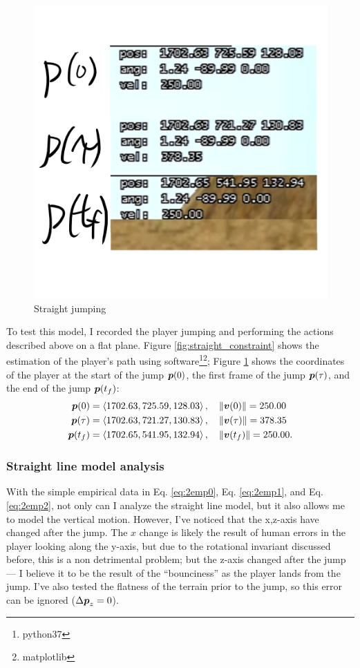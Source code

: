 \begin{figure}[H]
\begin{minipage}{.5\textwidth}
        \includegraphics[width=0.9\linewidth]{assets/2straightjumping.png}
        \caption{Straight jumping}
        \label{fig:2straightjumping}
    \end{minipage}
\end{figure}

To test this model, I recorded the player jumping and performing the actions described above on a flat plane. Figure \ref{fig:straight_constraint} shows the estimation of the player's path using software\footnote{python37}\footnote{matplotlib}; Figure \ref{fig:2straightjumping} shows the coordinates of the player at the start of the jump $\boldsymbol{p}(0)$, the first frame of the jump $\boldsymbol{p}(\tau)$, and the end of the jump $\boldsymbol{p}(t_f)$:
\begin{align}
 \boldsymbol{p}(0) &= \left\langle 1702.63, 725.59, 128.03 \right\rangle, \quad \|\boldsymbol{v}(0)\| = 250.00 \label{eq:2emp0}\\
 \boldsymbol{p}(\tau) &= \left\langle 1702.63, 721.27, 130.83 \right\rangle, \quad \|\boldsymbol{v}(\tau)\| = 378.35 \label{eq:2emp1}\\
 \boldsymbol{p}(t_f) &= \left\langle 1702.65,541.95, 132.94 \right\rangle, \quad \|\boldsymbol{v}(t_f)\| = 250.00 \label{eq:2emp2}.
\end{align}

\subsubsection{Straight line model analysis}
With the simple empirical data in Eq. \ref{eq:2emp0}, Eq. \ref{eq:2emp1}, and Eq. \ref{eq:2emp2}, not only can I analyze the straight line model, but it also allows me to model the vertical motion. However, I've noticed that the x,z-axis have changed after the jump. The $x$ change is likely the result of human errors in the player looking along the y-axis, but due to the rotational invariant discussed before, this is a non detrimental problem; but the z-axis changed after the jump --- I believe it to be the result of the ``bounciness'' as the player lands from the jump. I've also tested the flatness of the terrain prior to the jump, so this error can be ignored ($\Delta \boldsymbol{p}_z = 0$).

